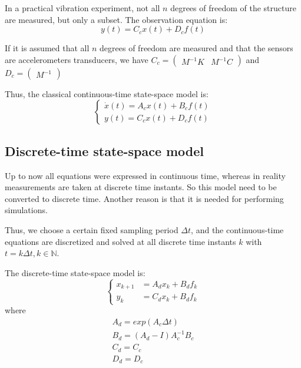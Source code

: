 \documentclass[journal]{IEEEtran}
\begin{document}
In a practical vibration experiment, not all $n$ degrees of freedom of the structure are measured, but only
a subset. The observation equation is:
\begin{equation}
y(t) = C_cx(t) + D_cf(t)
\end{equation}

If it is assumed that all $n$ degrees of freedom are measured and that the sensors are accelerometers transducers, we have
$C_c =
\begin{pmatrix}
M^{-1}K & M^{-1}C
\end{pmatrix}$
and
$D_c=
\begin{pmatrix}
M^{-1}
\end{pmatrix}$

Thus, the classical continuous-time state-space model is:
\begin{equation}
\left\{
\begin{array}{ll}
\dot{x}(t) = A_cx(t) + B_cf(t) \\
y(t) = C_cx(t) + D_cf(t)
\end{array}
\right.
\end{equation}

\subsection{Discrete-time state-space model} %

Up to now all equations were expressed in continuous time, whereas in reality
measurements are taken at discrete time instants.
So this model need to be converted to discrete time.
Another reason is that it is needed for performing simulations.

Thus, we choose a certain fixed sampling period $\Delta t$, and the continuous-time equations are discretized and solved at all
discrete time instants $k$ with $t = k \Delta t, k \in \mathbb{N}$.

The discrete-time state-space model is:
\begin{equation}
\left\{
\begin{array}{ll}
x_{k+1} & = A_dx_k + B_df_k \\
y_k & = C_dx_k + B_df_k
\end{array}
\right.
\label{discrete}
\end{equation}
where
\begin{equation}
\begin{array}{ll}
A_d = exp(A_c \Delta t) \\
B_d= (A_d - I) A^{-1}_c B_c \\
C_d = C_c \\
D_d = D_c
\end{array}
\end{equation}
\end{document}

